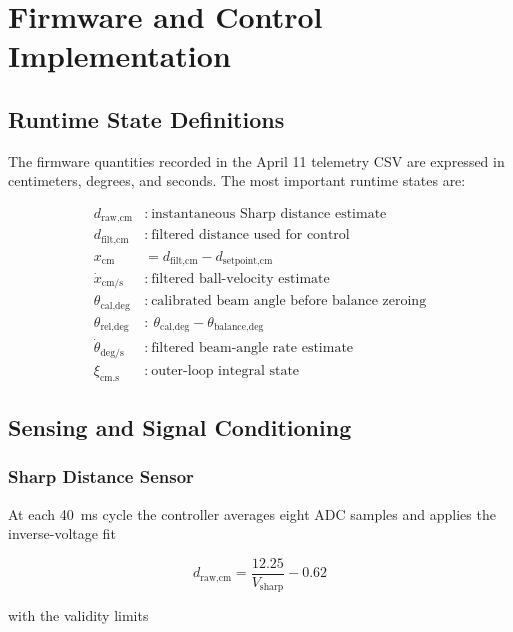 \chapter{Firmware and Control Implementation}

\section{Runtime State Definitions}

The firmware quantities recorded in the April 11 telemetry CSV are expressed in
centimeters, degrees, and seconds. The most important runtime states are:

\begin{align}
  d_{\text{raw,cm}}     &:\ \text{instantaneous Sharp distance estimate} \\
  d_{\text{filt,cm}}    &:\ \text{filtered distance used for control} \\
  x_{\text{cm}}         &= d_{\text{filt,cm}} - d_{\text{setpoint,cm}} \\
  \dot{x}_{\text{cm/s}} &:\ \text{filtered ball-velocity estimate} \\
  \theta_{\text{cal,deg}} &:\ \text{calibrated beam angle before balance zeroing} \\
  \theta_{\text{rel,deg}} &:\ \theta_{\text{cal,deg}} - \theta_{\text{balance,deg}} \\
  \dot{\theta}_{\text{deg/s}} &:\ \text{filtered beam-angle rate estimate} \\
  \xi_{\text{cm.s}} &:\ \text{outer-loop integral state}
\end{align}

\section{Sensing and Signal Conditioning}

\subsection{Sharp Distance Sensor}

At each \SI{40}{ms} cycle the controller averages eight ADC samples and applies the
inverse-voltage fit

\begin{equation}
  d_{\text{raw,cm}} = \frac{12.25}{V_{\text{sharp}}} - 0.62
\end{equation}

with the validity limits

